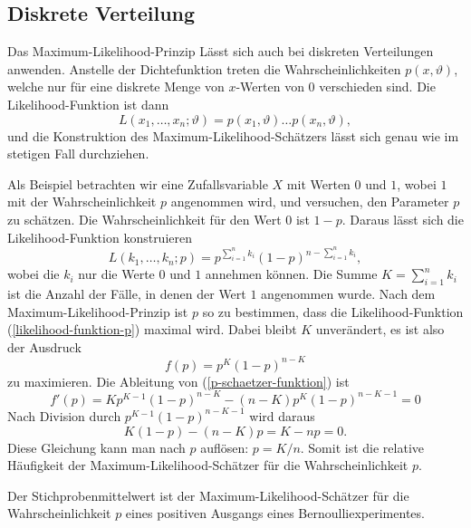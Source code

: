 \subsection{Diskrete Verteilung}
Das Maximum-Likelihood-Prinzip Lässt sich auch bei diskreten Verteilungen
anwenden.
Anstelle der Dichtefunktion treten die Wahrscheinlichkeiten
$p(x, \vartheta)$, welche nur für eine diskrete Menge von $x$-Werten
von $0$ verschieden sind.
Die Likelihood-Funktion ist dann
\begin{equation}
L(x_1,\dots,x_n;\vartheta)=p(x_1,\vartheta)\dots p(x_n,\vartheta),
\label{likelihood-funktion-diskret}
\end{equation}
und die Konstruktion des Maximum-Likelihood-Schätzers lässt sich genau
wie im stetigen Fall durchziehen.

Als Beispiel betrachten wir eine Zufallsvariable $X$ mit Werten $0$ und
$1$, wobei $1$ mit der Wahrscheinlichkeit $p$ angenommen wird,
und versuchen, den Parameter $p$ zu schätzen.
Die Wahrscheinlichkeit
für den Wert $0$ ist $1-p$.
Daraus lässt sich die Likelihood-Funktion konstruieren
\begin{equation}
L(k_1,\dots,k_n;p)=p^{\sum_{i=1}^nk_i}(1-p)^{n-\sum_{i=1}^nk_i},
\label{likelihood-funktion-p}
\end{equation}
wobei die $k_i$ nur die Werte $0$ und $1$ annehmen können.
Die Summe 
$K=\sum_{i=1}^nk_i$ ist die Anzahl der Fälle, in denen der Wert $1$
angenommen wurde.
Nach dem Maximum-Likelihood-Prinzip ist $p$ so zu bestimmen,
dass die Likelihood-Funktion
(\ref{likelihood-funktion-p})
maximal wird.
Dabei bleibt $K$ unverändert, es ist also der Ausdruck
\begin{equation}
f(p)=p^K(1-p)^{n-K}
\label{p-schaetzer-funktion}
\end{equation}
zu maximieren.
Die Ableitung von (\ref{p-schaetzer-funktion}) ist
\begin{equation}
f'(p)=Kp^{K-1}(1-p)^{n-K}-(n-K)p^K(1-p)^{n-K-1}=0
\end{equation}
Nach Division durch $p^{K-1}(1-p)^{n-K-1}$ wird daraus
\begin{equation}
K(1-p)-(n-K)p=K-np=0.
\end{equation}
Diese Gleichung kann man nach $p$ auflösen: $p=K/n$.
Somit ist die relative Häufigkeit der Maximum-Likelihood-Schätzer
für die Wahrscheinlichkeit $p$.
\begin{satz}
Der Stichprobenmittelwert ist der Maximum-Likelihood-Schätzer
für die Wahrscheinlichkeit $p$ eines
positiven Ausgangs eines Bernoulliexperimentes.
\end{satz}

